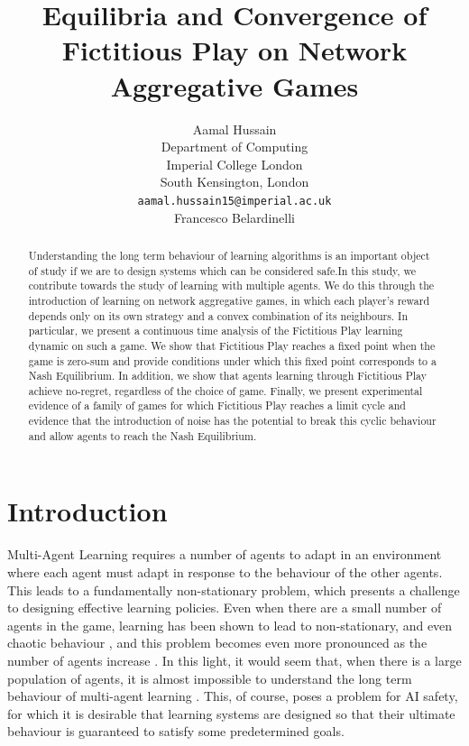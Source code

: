 \documentclass{article}
\title{Equilibria and Convergence of Fictitious Play on Network Aggregative Games}
\author{%
 Aamal Hussain  \\
  Department of Computing\\
  Imperial College London\\
  South Kensington, London \\
  \texttt{aamal.hussain15@imperial.ac.uk} \\
  \And
  Francesco Belardinelli
}
\theoremstyle{definition}
\begin{document}
\maketitle

\begin{abstract}
Understanding the long term behaviour of learning algorithms is an important object of study if we are to design systems which can be considered safe.In this study, we contribute towards the study of learning with multiple agents. We do this through the introduction of learning on network aggregative games, in which each player's reward depends only on its own strategy and a convex combination of its neighbours. In particular, we present a continuous time analysis of the Fictitious Play learning dynamic on such a game. We show that Fictitious Play reaches a fixed point when the game is zero-sum and provide conditions under which this fixed point corresponds to a Nash Equilibrium. In addition, we show that agents learning through Fictitious Play achieve no-regret, regardless of the choice of game. Finally, we present experimental evidence of a family of games for which Fictitious Play reaches a limit cycle and evidence that the introduction of noise has the potential to break this cyclic behaviour and allow agents to reach the Nash Equilibrium.
\end{abstract}

\section{Introduction}

Multi-Agent Learning \cite{Schwartz2014} requires a number of agents to adapt in an environment where
each agent must adapt in response to the behaviour of the other agents. This leads to a
fundamentally non-stationary problem, which presents a challenge to designing effective learning
policies. Even when there are a small number of agents in the game, learning has been shown to lead
to non-stationary, and even chaotic behaviour \cite{Sato2002}, and this problem becomes even more
pronounced as the number of agents increase \cite{Sanders2018}. In this light, it would seem that, when there is a large population of agents, it is almost impossible to understand the long term behaviour of multi-agent learning \cite{Chotibut2021}. This, of course, poses a problem for AI safety, for which it is desirable that learning systems are designed so that their ultimate behaviour is guaranteed to satisfy some predetermined goals.
\end{document}
